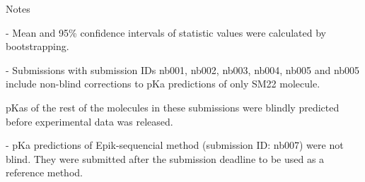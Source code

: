 \documentclass{article}
\begin{document}
Notes

- Mean and 95\% confidence intervals of statistic values were calculated by bootstrapping.

- Submissions with submission IDs nb001, nb002, nb003, nb004, nb005 and nb005 include non-blind corrections to pKa predictions of only SM22 molecule.

pKas of the rest of the molecules in these submissions were blindly predicted before experimental data was released.

- pKa predictions of Epik-sequencial method (submission ID: nb007) were not blind. They were submitted after the submission deadline to be used as a reference method.
\end{document}
